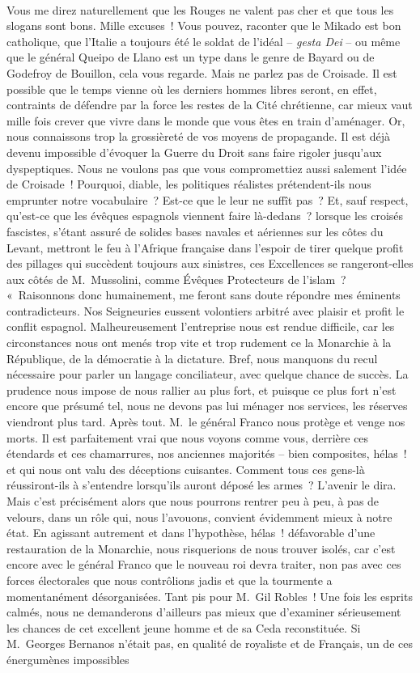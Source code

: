 \documentclass[french,twoside]{book} %
\begin{document}
\noindent  \par
Vous me direz naturellement que les Rouges ne valent pas cher et que tous les slogans sont bons. Mille excuses ! Vous pouvez, raconter que le Mikado est bon catholique, que l’Italie a toujours été le soldat de l’idéal – \emph{gesta Dei} – ou même que le général Queipo de Llano est un type dans le genre de Bayard ou de Godefroy de Bouillon, cela vous regarde. Mais ne parlez pas de Croisade. Il est possible que le temps vienne où les derniers hommes libres seront, en effet, contraints de défendre par la force les restes de la Cité chrétienne, car mieux vaut mille fois crever que vivre dans le monde que vous êtes en train d’aménager. Or, nous connaissons trop la grossièreté de vos moyens de propagande. Il est déjà devenu impossible d’évoquer la Guerre du Droit sans faire rigoler jusqu’aux dyspeptiques. Nous ne voulons pas que vous compromettiez aussi salement l’idée de Croisade ! Pourquoi, diable, les politiques réalistes prétendent-ils nous emprunter notre vocabulaire ? Est-ce que le leur ne suffît pas ? Et, sauf respect, qu’est-ce que les évêques espagnols viennent faire là-dedans ? lorsque les croisés fascistes, s’étant assuré de solides bases navales et aériennes sur les côtes du Levant, mettront le feu à l’Afrique française dans l’espoir de tirer quelque profit des pillages qui succèdent toujours aux sinistres, ces Excellences se rangeront-elles aux côtés de M. Mussolini, comme Évêques Protecteurs de l’islam ? « Raisonnons donc humainement, me feront sans doute répondre mes éminents contradicteurs. Nos Seigneuries eussent volontiers arbitré avec plaisir et profit le conflit espagnol. Malheureusement l’entreprise nous est rendue difficile, car les circonstances nous ont menés trop vite et trop rudement ce la Monarchie à la République, de la démocratie à la dictature. Bref, nous manquons du recul nécessaire pour parler un langage conciliateur, avec quelque chance de succès. La prudence nous impose de nous rallier au plus fort, et puisque ce plus fort n’est encore que présumé tel, nous ne devons pas lui ménager nos services, les réserves viendront plus tard. Après tout. M. le général Franco nous protège et venge nos morts. Il est parfaitement vrai que nous voyons comme vous, derrière ces étendards et ces chamarrures, nos anciennes majorités – bien composites, hélas ! et qui nous ont valu des déceptions cuisantes. Comment tous ces gens-là réussiront-ils à s’entendre lorsqu’ils auront déposé les armes ? L’avenir le dira. Mais c’est précisément alors que nous pourrons rentrer peu à peu, à pas de velours, dans un rôle qui, nous l’avouons, convient évidemment mieux à notre état. En agissant autrement et dans l’hypothèse, hélas ! défavorable d’une restauration de la Monarchie, nous risquerions de nous trouver isolés, car c’est encore avec le général Franco que le nouveau roi devra traiter, non pas avec ces forces électorales que nous contrôlions jadis et que la tourmente a momentanément désorganisées. Tant pis pour M. Gil Robles ! Une fois les esprits calmés, nous ne demanderons d’ailleurs pas mieux que d’examiner sérieusement les chances de cet excellent jeune homme et de sa Ceda reconstituée. Si M. Georges Bernanos n’était pas, en qualité de royaliste et de Français, un de ces énergumènes impossibles 
\end{document}
